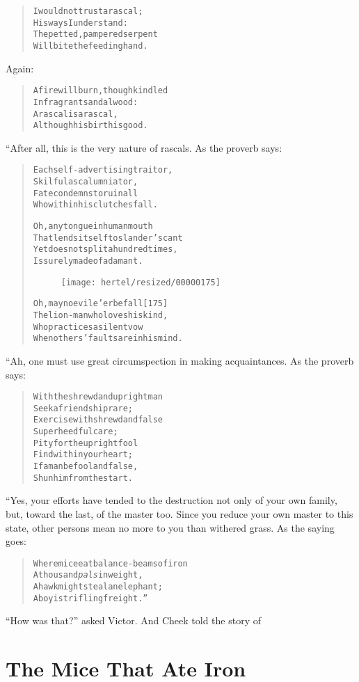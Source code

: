 \documentclass[article, twoside, 10pt]{memoir}
\renewenvironment{verbatim}{%
\begin{quote}%
\vskip -10pt%
\begin{alltt}\normalfont\small}{\end{alltt}%
\end{quote}%
\vskip -10pt
} %
\begin{document}
\begin{verbatim}
I would not trust a rascal;
    His ways I understand:
The petted, pampered serpent
    Will bite the feeding hand.
\end{verbatim}
Again:

\begin{verbatim}
A fire will burn, though kindled
    In fragrant sandalwood:
A rascal is a rascal,
    Although his birth is good.
\end{verbatim}
“After all, this is the very nature of rascals. As the proverb
says:

\begin{verbatim}
Each self-advertising traitor,
Skilful as calumniator,
Fate condemns to ruin all
Who within his clutches fall.

Oh, any tongue in human mouth
    That lends itself to slander's cant
Yet does not split a hundred times,
    Is surely made of adamant.

\begin{figure}[p]\texttt{[image: hertel/resized/00000175]}\end{figure}Oh, may no evil e'er befall                             [175]
    The lion-man who loves his kind,
Who practices a silent vow
    When others' faults are in his mind.
\end{verbatim}
“Ah, one must use great circumspection in making acquaintances. As
the proverb says:

\begin{verbatim}
With the shrewd and upright man
    Seek a friendship rare;
Exercise with shrewd and false
    Superheedful care;
Pity for the upright fool
    Find within your heart;
If a man be fool and false,
    Shun him from the start.
\end{verbatim}
“Yes, your efforts have tended to the destruction not only of your
own family, but, toward the last, of the master too. Since you
reduce your own master to this state, other persons mean no more to
you than withered grass. As the saying goes:

\begin{verbatim}
Where mice eat balance-beams of iron
    A thousand \emph{pals} in weight,
A hawk might steal an elephant;
    A boy is trifling freight.”
\end{verbatim}
``How was that?'' asked Victor. And Cheek told the story of

\chapter{The Mice That Ate Iron}
\end{document}
